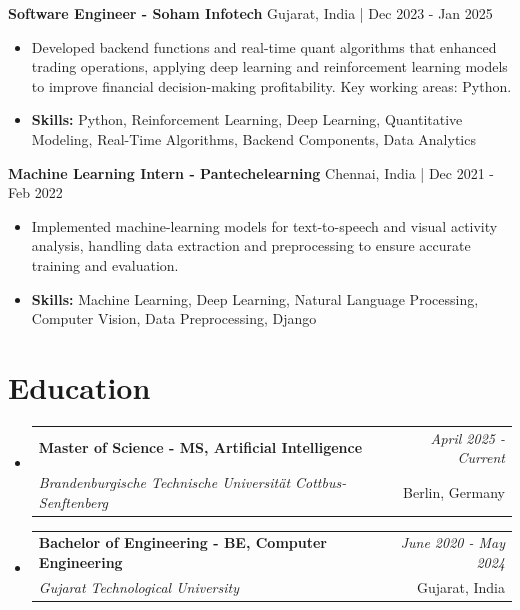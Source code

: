 \documentclass[a4paper,11pt]{article}
\makeatletter
\newcommand{\resumeSubheading}[4]{
\vspace{0.5mm}\item
    \begin{tabular*}{0.98\textwidth}[t]{l@{\extracolsep{\fill}}r}
        \textbf{#1} & \textit{\footnotesize{#4}} \\
        \textit{\footnotesize{#3}} &  \footnotesize{#2}\\
    \end{tabular*}
    \vspace{-2.4mm}
}
\makeatother
\begin{document}
\vspace{1mm}
  \textbf{Software Engineer - Soham Infotech} \hfill Gujarat, India | Dec 2023 - Jan 2025
\vspace{-1.5mm} %
\begin{itemize}
  \item Developed backend functions and real-time quant algorithms that enhanced trading operations, applying deep learning and reinforcement learning models to improve financial decision-making profitability. Key working areas: Python.

\vspace{-2mm}
  \item \textbf{Skills:} Python, Reinforcement Learning, Deep Learning, Quantitative Modeling, Real-Time Algorithms, Backend Components, Data Analytics
\end{itemize}

\vspace{1mm}
  \textbf{Machine Learning Intern - Pantechelearning} \hfill Chennai, India | Dec 2021 - Feb 2022
\vspace{-1.5mm} %
\begin{itemize}
  \item Implemented machine-learning models for text-to-speech and visual activity analysis, handling data extraction and preprocessing to ensure accurate training and evaluation.
\vspace{-2mm}
  \item \textbf{Skills:} Machine Learning, Deep Learning, Natural Language Processing, Computer Vision, Data Preprocessing, Django
\end{itemize}\section{\textbf{Education}}
\vspace{-0.4mm}

\begin{itemize}
\resumeSubheading
{Master of Science - MS, Artificial Intelligence }{Berlin, Germany}
{Brandenburgische Technische Universität Cottbus-Senftenberg  }{April 2025 - Current}

\vspace{1.0mm} %
\resumeSubheading
{Bachelor of Engineering - BE, Computer Engineering  }{Gujarat, India}
{Gujarat Technological University }{June 2020 - May 2024}

\end{itemize}
\end{document}
